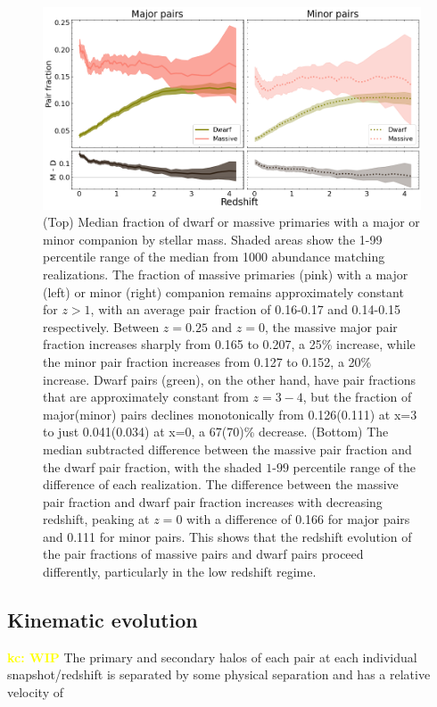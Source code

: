 \documentclass[twocolumn]{aastex631}
\newcommand{\kc}[1]{\textcolor{yellow}{\textbf{kc: #1}} }
\begin{document}
\label{sec:results}
\begin{figure}[htp]
  \centering
  \includegraphics[width=\textwidth]{pairfrac_1000.png}
  \caption{
    (Top) Median fraction of dwarf or massive primaries with a major or minor companion by stellar mass. 
    Shaded areas show the 1-99 percentile range of the median from 1000 abundance matching realizations. 
    The fraction of massive primaries (pink) with a major (left) or minor (right) companion remains approximately constant for $z>1$, with an average pair fraction of 0.16-0.17 and 0.14-0.15 respectively. Between $z=0.25$ and $z=0$, the massive major pair fraction increases sharply from 0.165 to 0.207, a 25\% increase, while the minor pair fraction increases from 0.127 to 0.152, a 20\% increase.
    Dwarf pairs (green), on the other hand, have pair fractions that are approximately constant from $z=3-4$, but the fraction of major(minor) pairs declines monotonically from 0.126(0.111) at x=3 to just 0.041(0.034) at x=0, a 67(70)\% decrease. 
  (Bottom) The median subtracted difference between the massive pair fraction and the dwarf pair fraction, with the shaded $1$-$99$ percentile range of the difference of each realization. The difference between the massive pair fraction and dwarf pair fraction increases with decreasing redshift, peaking at $z=0$ with a difference of 0.166 for major pairs and 0.111 for minor pairs. This shows that the redshift evolution of the pair fractions of massive pairs and dwarf pairs proceed differently, particularly in the low redshift regime.}
  \label{fig:pairratio}
\end{figure}

\subsection{Kinematic evolution}\label{sec:results-kinematics}
\kc{WIP}
The primary and secondary halos of each pair at each individual snapshot/redshift is separated by some physical separation and has a relative velocity of 
\end{document}
